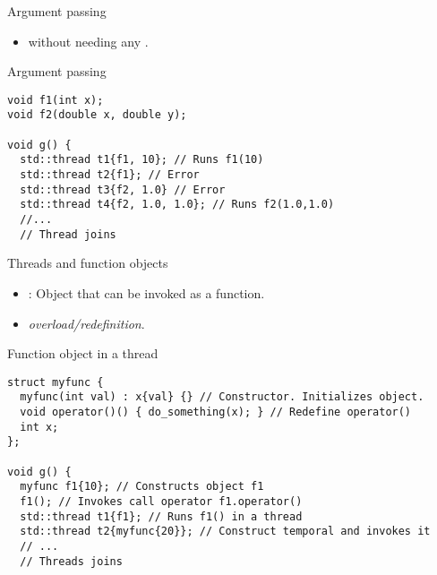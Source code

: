 \begin{frame}[fragile]{Argument passing}
\begin{itemize}
  \item {} without needing any .
\end{itemize}

\begin{block}{Argument passing}
\begin{lstlisting}
void f1(int x);
void f2(double x, double y);

void g() {
  std::thread t1{f1, 10}; // Runs f1(10)
  std::thread t2{f1}; // Error
  std::thread t3{f2, 1.0} // Error
  std::thread t4{f2, 1.0, 1.0}; // Runs f2(1.0,1.0)
  //...
  // Thread joins 
\end{lstlisting}
\end{block}
\end{frame}

\begin{frame}[fragile]{Threads and function objects}
\begin{itemize}
  \item {}: Object that can be invoked as a function.
  \item {} \cppid{()} \emph{overload/redefinition}.
\end{itemize}

\begin{block}{Function object in a thread}
\begin{lstlisting}
struct myfunc {
  myfunc(int val) : x{val} {} // Constructor. Initializes object.
  void operator()() { do_something(x); } // Redefine operator()
  int x;
};

void g() {
  myfunc f1{10}; // Constructs object f1
  f1(); // Invokes call operator f1.operator()
  std::thread t1{f1}; // Runs f1() in a thread
  std::thread t2{myfunc{20}}; // Construct temporal and invokes it
  // ...
  // Threads joins
\end{lstlisting}
\end{block}
\end{frame}

